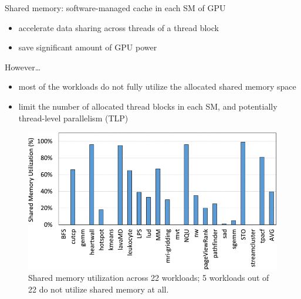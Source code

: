 \documentclass[
    fontset=fandol,
    xcolor=svgnames %
]{ctexbeamer}
\begin{document}
\begin{frame}

    \begin{block}{Shared memory: software-managed cache in each SM of GPU}
        \begin{itemize}
            \item accelerate data sharing across threads of a thread block
            \item save significant amount of GPU
                  power
        \end{itemize}
    \end{block}

    \begin{block}{However\dots}
        \begin{itemize}
            \item most of the workloads
                  do not fully utilize the allocated shared memory space
            \item limit the number of allocated thread blocks in each SM, and potentially thread-level parallelism (TLP)
        \end{itemize}
    \end{block}

\end{frame}

\begin{frame}

    \begin{figure}
        \includegraphics[width=1\textwidth]{assets/figure/sadro1-3154315-large.png}
        \caption{Shared memory utilization across 22 workloads; 5 workloads out of 22 do not utilize shared memory at all.}
    \end{figure}

\end{frame}
\end{document}
